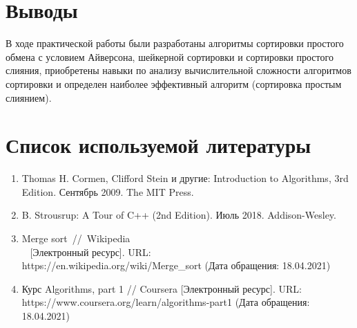 \documentclass[a4paper, 14pt]{extarticle}
\begin{document}
\section*{Выводы}
В ходе практической работы были разработаны алгоритмы сортировки
простого обмена с условием Айверсона, шейкерной сортировки
и сортировки простого слияния, приобретены навыки по анализу
вычислительной сложности алгоритмов сортировки и определен наиболее
эффективный алгоритм (сортировка простым слиянием).
\section*{Список используемой литературы}
\begin{enumerate}[leftmargin=*] %
  \item Thomas H. Cormen, Clifford Stein и другие: Introduction to Algorithms, 3rd Edition.
    Сентябрь 2009. The MIT Press.
  \item B. Strousrup: A Tour of C++ (2nd Edition). Июль 2018. Addison-Wesley.
  \item Merge sort~//~Wikipedia \\~
    [Электронный ресурс]. URL:
    \\ https://en.wikipedia.org/wiki/Merge\_sort 
    (Дата обращения: 18.04.2021)
   \item Курс Algorithms, part 1 // Coursera [Электронный ресурс]. URL:
     \\ https://www.coursera.org/learn/algorithms-part1
     (Дата обращения: 18.04.2021)
\end{enumerate}
\end{document}
